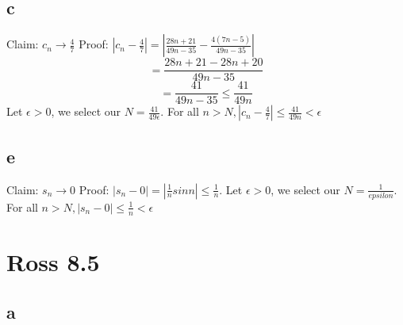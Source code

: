 \documentclass[12pt]{article}
\begin{document}
\subsection{c}
Claim: $c_n \to \frac{4}{7}$
\newline
Proof: $|c_n- \frac{4}{7}| = |\frac{28n+21}{49n-35} - \frac{4(7n-5)}{49n-35}|$
$$= \frac{28n+21-28n+20}{49n-35}$$
$$= \frac{41}{49n-35} \leq \frac{41}{49n}$$
\newline
Let  $\epsilon > 0$, we select our $N = \frac{41}{49\epsilon}$. For all $n>N, |c_n- \frac{4}{7}| \leq \frac{41}{49n} < \epsilon$

\subsection{e}
Claim: $s_n \to 0$
\newline
Proof: $|s_n - 0| = |\frac{1}{n}sin n| \leq \frac{1}{n}$.
\newline
Let  $\epsilon > 0$, we select our $N = \frac{1}{epsilon}$. For all $n>N, |s_n-0| \leq \frac{1}{n} < \epsilon$
\newpage


\section{Ross 8.5}
\subsection{a}
\end{document}
